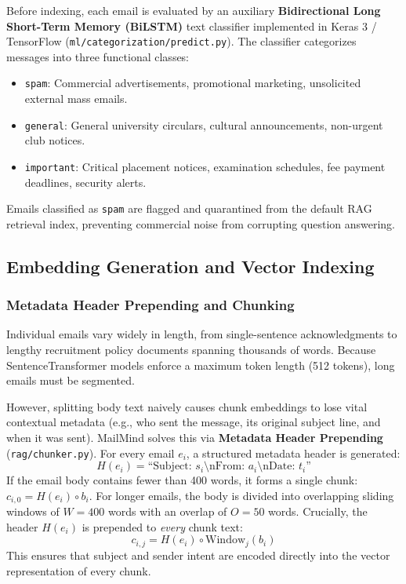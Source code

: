 \documentclass[11pt,a4paper]{article}
\begin{document}
Before indexing, each email is evaluated by an auxiliary \textbf{Bidirectional Long Short-Term Memory (BiLSTM)} text classifier implemented in Keras 3 / TensorFlow (\texttt{ml/categorization/predict.py}). The classifier categorizes messages into three functional classes:
\begin{itemize}
    \item \texttt{spam}: Commercial advertisements, promotional marketing, unsolicited external mass emails.
    \item \texttt{general}: General university circulars, cultural announcements, non-urgent club notices.
    \item \texttt{important}: Critical placement notices, examination schedules, fee payment deadlines, security alerts.
\end{itemize}
Emails classified as \texttt{spam} are flagged and quarantined from the default RAG retrieval index, preventing commercial noise from corrupting question answering.

\subsection{Embedding Generation and Vector Indexing}
\subsubsection{Metadata Header Prepending and Chunking}
Individual emails vary widely in length, from single-sentence acknowledgments to lengthy recruitment policy documents spanning thousands of words. Because SentenceTransformer models enforce a maximum token length (512 tokens), long emails must be segmented. 

However, splitting body text naively causes chunk embeddings to lose vital contextual metadata (e.g., who sent the message, its original subject line, and when it was sent). MailMind solves this via \textbf{Metadata Header Prepending} (\texttt{rag/chunker.py}). For every email $e_i$, a structured metadata header is generated:
\begin{equation}
    H(e_i) = \text{``Subject: } s_i \text{\textbackslash nFrom: } a_i \text{\textbackslash nDate: } t_i \text{''}
\end{equation}
If the email body contains fewer than 400 words, it forms a single chunk: $c_{i,0} = H(e_i) \circ b_i$. For longer emails, the body is divided into overlapping sliding windows of $W = 400$ words with an overlap of $O = 50$ words. Crucially, the header $H(e_i)$ is prepended to \textit{every} chunk text:
\begin{equation}
    c_{i,j} = H(e_i) \circ \text{Window}_j(b_i)
\end{equation}
This ensures that subject and sender intent are encoded directly into the vector representation of every chunk.
\end{document}
